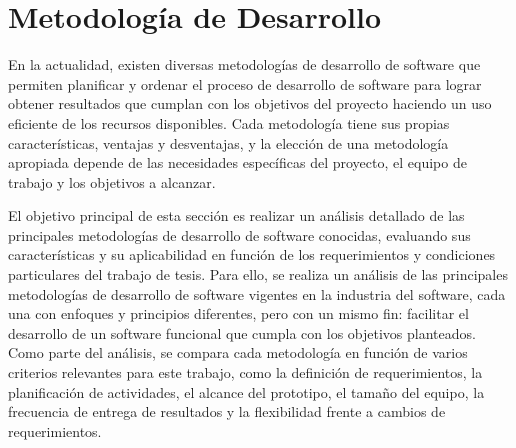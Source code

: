 
\section{Metodología de Desarrollo}
\label{sec:software-method}

En la actualidad, existen diversas metodologías de desarrollo de software que permiten planificar y ordenar el proceso de desarrollo de software para lograr obtener resultados que cumplan con los objetivos del proyecto haciendo un uso eficiente de los recursos disponibles. Cada metodología tiene sus propias características, ventajas y desventajas, y la elección de una metodología apropiada depende de las necesidades específicas del proyecto, el equipo de trabajo y los objetivos a alcanzar.

El objetivo principal de esta sección es realizar un análisis detallado de las principales metodologías de desarrollo de software conocidas, evaluando sus características y su aplicabilidad en función de los requerimientos y condiciones particulares del trabajo de tesis. Para ello, se realiza un análisis de las principales metodologías de desarrollo de software vigentes en la industria del software, cada una con enfoques y principios diferentes, pero con un mismo fin: facilitar el desarrollo de un software funcional que cumpla con los objetivos planteados. Como parte del análisis, se compara cada metodología en función de varios criterios relevantes para este trabajo, como la definición de requerimientos, la planificación de actividades, el alcance del prototipo, el tamaño del equipo, la frecuencia de entrega de resultados y la flexibilidad frente a cambios de requerimientos.

